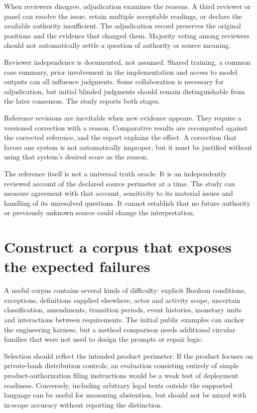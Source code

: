 When reviewers disagree, adjudication examines the reasons. A third reviewer or
panel can resolve the issue, retain multiple acceptable readings, or declare the
available authority insufficient. The adjudication record preserves the original
positions and the evidence that changed them. Majority voting among reviewers
should not automatically settle a question of authority or source meaning.

Reviewer independence is documented, not assumed. Shared training, a common case
summary, prior involvement in the implementation and access to model outputs can
all influence judgments. Some collaboration is necessary for adjudication, but
initial blinded judgments should remain distinguishable from the later consensus.
The study reports both stages.

Reference revisions are inevitable when new evidence appears. They require a
versioned correction with a reason. Comparative results are recomputed against
the corrected reference, and the report explains the effect. A correction that
favors one system is not automatically improper, but it must be justified without
using that system's desired score as the reason.

The reference itself is not a universal truth oracle. It is an independently
reviewed account of the declared source perimeter at a time. The study can measure
agreement with that account, sensitivity to its material issues and handling of
its unresolved questions. It cannot establish that no future authority or
previously unknown source could change the interpretation.

\section{Construct a corpus that exposes the expected failures}
\label{merge:M09:03}


A useful corpus contains several kinds of difficulty: explicit Boolean conditions,
exceptions, definitions supplied elsewhere, actor and activity scope, uncertain
classification, amendments, transition periods, event histories, monetary units
and interactions between requirements. The initial public examples can anchor the
engineering harness, but a method comparison needs additional circular families
that were not used to design the prompts or repair logic.

Selection should reflect the intended product perimeter. If the product focuses
on private-bank distribution controls, an evaluation consisting entirely of simple
product-authorization filing instructions would be a weak test of deployment
readiness. Conversely, including arbitrary legal texts outside the supported
language can be useful for measuring abstention, but should not be mixed with
in-scope accuracy without reporting the distinction.

